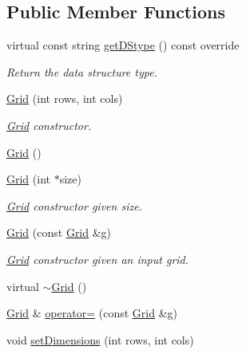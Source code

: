 \subsection*{Public Member Functions}
\begin{DoxyCompactItemize}
\item 
virtual const string \hyperlink{classbridges_1_1datastructure_1_1_grid_a16aeae38446b96f440dea15f2b19334d}{get\+D\+Stype} () const override
\begin{DoxyCompactList}\small\item\em Return the data structure type. \end{DoxyCompactList}\item 
\hyperlink{classbridges_1_1datastructure_1_1_grid_a80d8bca9d3793d896a92168a54ce7b2b}{Grid} (int rows, int cols)
\begin{DoxyCompactList}\small\item\em \hyperlink{classbridges_1_1datastructure_1_1_grid}{Grid} constructor. \end{DoxyCompactList}\item 
\hyperlink{classbridges_1_1datastructure_1_1_grid_a41c8c94cd9a22ccf978c5e2b1141c813}{Grid} ()
\item 
\hyperlink{classbridges_1_1datastructure_1_1_grid_ad47ddbed7bbd07f98aaa61b74fcf826c}{Grid} (int $\ast$size)
\begin{DoxyCompactList}\small\item\em \hyperlink{classbridges_1_1datastructure_1_1_grid}{Grid} constructor given size. \end{DoxyCompactList}\item 
\hyperlink{classbridges_1_1datastructure_1_1_grid_afc81003993a30d1112d2dff71bfc191b}{Grid} (const \hyperlink{classbridges_1_1datastructure_1_1_grid}{Grid} \&g)
\begin{DoxyCompactList}\small\item\em \hyperlink{classbridges_1_1datastructure_1_1_grid}{Grid} constructor given an input grid. \end{DoxyCompactList}\item 
virtual \hyperlink{classbridges_1_1datastructure_1_1_grid_aa04b4929a35fa359dbaab86e46fda204}{$\sim$\+Grid} ()
\item 
\hyperlink{classbridges_1_1datastructure_1_1_grid}{Grid} \& \hyperlink{classbridges_1_1datastructure_1_1_grid_a3522d8c94ad390ebafb12257a6c9b82f}{operator=} (const \hyperlink{classbridges_1_1datastructure_1_1_grid}{Grid} \&g)
\item 
void \hyperlink{classbridges_1_1datastructure_1_1_grid_a234818a9e22b6cefe943210c088c2a76}{set\+Dimensions} (int rows, int cols)

\end{DoxyCompactItemize}
